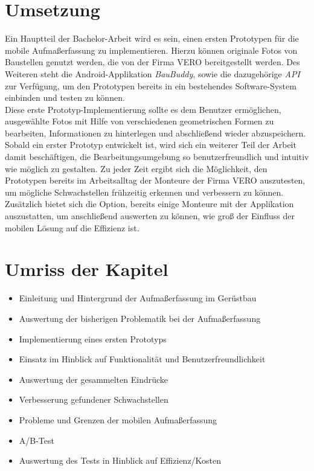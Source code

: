 \documentclass[a4paper]{article}
\newcommand{\vero}{\textsc{VERO}}
\begin{document}
\section*{Umsetzung}
Ein Hauptteil der Bachelor-Arbeit wird es sein, einen ersten Prototypen für die mobile Aufmaßerfassung zu implementieren.
Hierzu können originale Fotos von Baustellen genutzt werden, die von der Firma \vero{} bereitgestellt werden.
Des Weiteren steht die Android-Applikation \textit{BauBuddy}, sowie die dazugehörige \textit{API} zur Verfügung, um den Prototypen bereits in ein bestehendes Software-System einbinden und testen zu können. \\
Diese erste Prototyp-Implementierung sollte es dem Benutzer ermöglichen, ausgewählte Fotos mit Hilfe von verschiedenen geometrischen Formen zu bearbeiten, Informationen zu hinterlegen und abschließend wieder abzuspeichern.
Sobald ein erster Prototyp entwickelt ist, wird sich ein weiterer Teil der Arbeit damit beschäftigen, die Bearbeitungsumgebung so benutzerfreundlich und intuitiv wie möglich zu gestalten.
Zu jeder Zeit ergibt sich die Möglichkeit, den Prototypen bereits im Arbeitsalltag der Monteure der Firma \vero{} auszutesten, um mögliche Schwachstellen frühzeitig erkennen und verbessern zu können.
Zusätzlich bietet sich die Option, bereits einige Monteure mit der Applikation auszustatten, um anschließend auswerten zu können, wie groß der Einfluss der mobilen Lösung auf die Effizienz ist.

\section*{Umriss der Kapitel}
\begin{itemize}
    \item Einleitung und Hintergrund der Aufmaßerfassung im Gerüstbau
    \item Auswertung der bisherigen Problematik bei der Aufmaßerfassung
    \item Implementierung eines ersten Prototyps
    \item Einsatz im Hinblick auf Funktionalität und Benutzerfreundlichkeit
    \item Auswertung der gesammelten Eindrücke
    \item Verbesserung gefundener Schwachstellen
    \item Probleme und Grenzen der mobilen Aufmaßerfassung
    \item A/B-Test
    \item Auswertung des Tests in Hinblick auf Effizienz/Kosten
\end{itemize}
\end{document}
